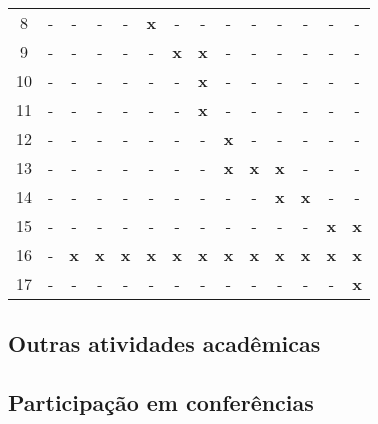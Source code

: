 \documentclass[12pt]{article}
\begin{document}
\begin{table}[ht!]
\begin{center}
{\begin{tabular}{c c ccc ccc ccc ccc}
    8
    & \small - & \small - & \small - & \small -  
    & \small {\bf x} & \small - & \small - & \small -
    & \small - & \small - & \small - & \small - & \small - \\ 
    9
    & \small - & \small - & \small - & \small -  
    & \small - & \small {\bf x} & \small {\bf x} & \small -
    & \small - & \small - & \small - & \small - & \small - \\ 
    10
    & \small - & \small - & \small - & \small -  
    & \small - & \small - & \small {\bf x} & \small -
    & \small - & \small - & \small - & \small - & \small - \\ 
    11
    & \small - & \small - & \small - & \small -  
    & \small - & \small - & \small {\bf x} & \small -
    & \small - & \small - & \small - & \small - & \small - \\ 
    12
    & \small - & \small - & \small - & \small -  
    & \small - & \small - & \small - & \small {\bf x}
    & \small - & \small - & \small - & \small - & \small - \\ 
    13
    & \small - & \small - & \small - & \small -  
    & \small - & \small - & \small - & \small {\bf x}
    & \small {\bf x} & \small {\bf x} & \small - & \small - & \small - \\ 
    14
    & \small - & \small - & \small - & \small -  
    & \small - & \small - & \small - & \small -
    & \small - & \small {\bf x} & \small {\bf x} & \small - & \small - \\ 

    15
    & \small - & \small - & \small - & \small -  
    & \small - & \small - & \small - & \small -
    & \small - & \small - & \small - & \small {\bf x} & \small {\bf x} \\ 
    16
    & \small - & \small {\bf x} & \small {\bf x} & \small {\bf x}  
    & \small {\bf x} & \small {\bf x} & \small {\bf x} & \small {\bf x}
    & \small {\bf x} & \small {\bf x} & \small {\bf x} & \small {\bf x} & \small {\bf x} \\ 
    17
    & \small - & \small - & \small - & \small -  
    & \small - & \small - & \small - & \small -
    & \small - & \small - & \small - & \small - & \small {\bf x} \\ 

    \bottomrule
\end{tabular}
}
\end{center}
\end{table}




\subsection{Outras atividades acadêmicas}

\subsection{Participação em conferências}


 

\end{document}
